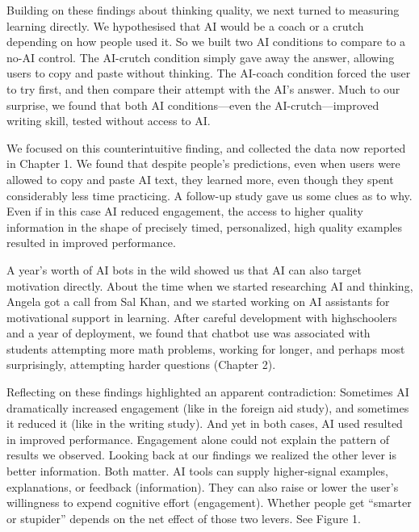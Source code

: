 \documentclass[11pt]{report}
\begin{document}
\begin{mainf}
Building on these findings about thinking quality, we next turned to measuring learning directly.
We hypothesised that AI would be a coach or a crutch depending on how people used it. 
So we built two AI conditions to compare to a no-AI control. 
The AI-crutch condition simply gave away the answer, allowing users to copy and paste without thinking. 
The AI-coach condition forced the user to try first, and then compare their attempt with the AI's answer. 
Much to our surprise, we found that both AI conditions—even the AI-crutch—improved writing skill, tested without access to AI. 

We focused on this counterintuitive finding, and collected the data now reported in Chapter 1. 
We found that despite people's predictions, even when users were allowed to copy and paste AI text, they learned more, even though they spent considerably less time practicing. 
A follow-up study gave us some clues as to why. 
Even if in this case AI reduced engagement, the access to higher quality information in the shape of precisely timed, personalized, high quality examples resulted in improved performance.

A year’s worth of AI bots in the wild showed us that AI can also target motivation directly. 
About the time when we started researching AI and thinking, Angela got a call from Sal Khan, and we started working on AI assistants for motivational support in learning. 
After careful development with highschoolers and a year of deployment, we found that chatbot use was associated with students attempting more math problems, working for longer, and perhaps most surprisingly, attempting harder questions (Chapter 2).

Reflecting on these findings highlighted an apparent contradiction: 
Sometimes AI dramatically increased engagement (like in the foreign aid study), and sometimes it reduced it (like in the writing study). 
And yet in both cases, AI used resulted in improved performance. 
Engagement alone could not explain the pattern of results we observed. 
Looking back at our findings we realized the other lever is better information. 
Both matter. AI tools can supply higher‑signal examples, explanations, or feedback (information). 
They can also raise or lower the user’s willingness to expend cognitive effort (engagement). 
Whether people get “smarter or stupider” depends on the net effect of those two levers. See Figure 1.


\usetikzlibrary{positioning}

\begin{figure}[ht]
    \centering
\end{figure}
\end{mainf}
\end{document}

